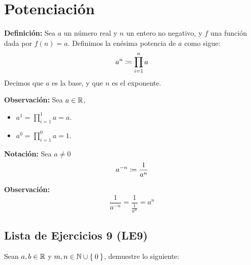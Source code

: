\section*{Potenciación}

\textbf{Definición:} Sea $a$ un número real y $n$ un entero no negativo, y $f$ una función dada por $f(n)=a$. Definimos la enésima potencia de $a$ como sigue:
\[a^n \coloneqq \prod_{i=1}^{n} a\]
Decimos que $a$ es la base, y que $n$ es el exponente.

\textbf{Observación:} Sea $a\in \mathbb{R}$,
\begin{itemize}
  \item $a^1= \prod_{i=1}^{1} a = a$.
  \item $a^0 = \prod_{i=1}^{0} a = 1$.%
\end{itemize}

\textbf{Notación:} Sea $a\neq 0$ \[a^{-n}\coloneqq \frac{1}{a^n}\]

\textbf{Observación:} \[\frac{1}{a^{-n}} = \frac{1}{\frac{1}{a^n}} = a^n\]

\subsection*{Lista de Ejercicios 9 (LE9)}

Sean $a,b\in \mathbb{R}$ y $m, n\in \mathbb{N}\cup\Set{0}$, demuestre lo siguiente:

